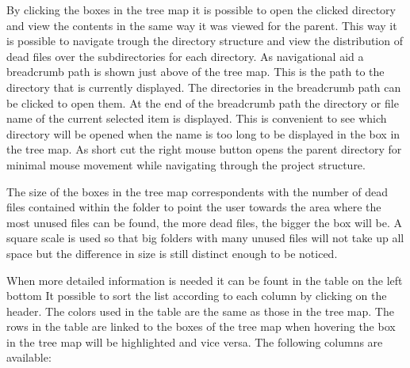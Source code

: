 By clicking the boxes in the tree map it is possible to open the clicked directory and view the contents in the same way it was viewed for the parent. This way it is possible to navigate trough the directory structure and view the distribution of dead files over the subdirectories for each directory. As navigational aid a breadcrumb path\cite{hudson2004,lida2003,rogers2003} is shown just above of the tree map. This is the path to the directory that is currently displayed. The directories in the breadcrumb path can be clicked to open them. At the end of the breadcrumb path the directory or file name of the current selected item is displayed. This is convenient to see which directory will be opened when the name is too long to be displayed in the box in the tree map. As short cut the right mouse button opens the parent directory for minimal mouse movement while navigating through the project structure. 

The size of the boxes in the tree map correspondents with the number of dead files contained within the folder to point the user towards the area where the most unused files can be found, the more dead files, the bigger the box will be. A square scale is used so that big folders with many unused files will not take up all space but the difference in size is still distinct enough to be noticed.


When more detailed information is needed it can be fount in the table on the left bottom It possible to sort the list according to each column by clicking on the header. The colors used in the table are the same as those in the tree map. The rows in the table are linked to the boxes of the tree map when hovering the box in the tree map will be highlighted and vice versa. The following columns are available:

